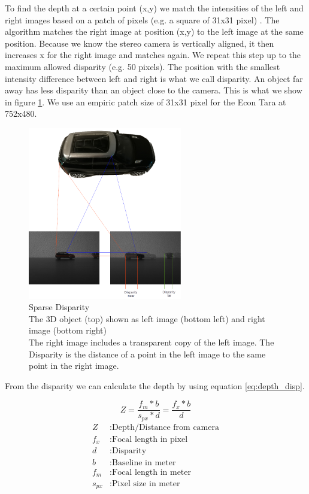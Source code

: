 \documentclass[11pt,a4paper,titlepage,oneside]{report}
\begin{document}
To find the depth at a certain point (x,y) we match the intensities of the left and right images based on a patch of pixels (e.g. a square of 31x31 pixel) \cite{rvc}. The algorithm matches the right image at position (x,y) to the left image at the same position. Because we know the stereo camera is vertically aligned, it then increases x for the right image and matches again. We repeat this step up to the maximum allowed disparity (e.g. 50 pixels). The position with the smallest intensity difference between left and right is what we call disparity. An object far away has less disparity than an object close to the camera. This is what we show in figure \ref{fig:disparity}. We use an empiric patch size of 31x31 pixel for the Econ Tara at 752x480.

\begin{figure}[H]
  \begin{center}
    \includegraphics[width=0.6\textwidth]{img/disparity_concept.png}
  \end{center}
  \caption{Sparse Disparity\\
  The 3D object (top) shown as left image (bottom left) and right image (bottom right)\\
  The right image includes a transparent copy of the left image. The Disparity is the distance of a point in the left image to the same point in the right image.}
  \label{fig:disparity}
\end{figure}

From the disparity we can calculate the depth by using equation \ref{eq:depth_disp}.

\begin{equation}\label{eq:depth_disp}
  Z=\frac{f_m*b}{s_{px}*d}=\frac{f_x*b}{d}
\end{equation}
\begin{align*}
  Z       &: \text{Depth/Distance from camera}\\
  f_x     &: \text{Focal length in pixel}\\
  d       &: \text{Disparity}\\
  b       &: \text{Baseline in meter}\\
  f_m     &: \text{Focal length in meter}\\
  s_{px}  &: \text{Pixel size in meter}
\end{align*}
\end{document}
